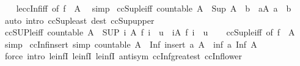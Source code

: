 \begin{isabellebody}
%
\isadelimproof
\ \ %
\endisadelimproof
%
\isatagproof
{}\isamarkupfalse%
\ le{\isacharunderscore}ccInf{\isacharunderscore}iff\ {\isacharbrackleft}of\ {\isachardoublequoteopen}f\ {\isacharbackquote}\ A{\isachardoublequoteclose}{\isacharbrackright}\ \isamarkupfalse%
\ simp%
\endisatagproof
{\isafoldproof}%
%
\isadelimproof
\isanewline
%
\endisadelimproof
\isanewline
{}\isamarkupfalse%
\ ccSup{\isacharunderscore}le{\isacharunderscore}iff{\isacharcolon}\ {\isachardoublequoteopen}countable\ A\ {\isasymLongrightarrow}\ Sup\ A\ {\isasymle}\ b\ {\isasymlongleftrightarrow}\ {\isacharparenleft}{\isasymforall}a{\isasymin}A{\isachardot}\ a\ {\isasymle}\ b{\isacharparenright}{\isachardoublequoteclose}\isanewline
%
\isadelimproof
\ \ %
\endisadelimproof
%
\isatagproof
{}\isamarkupfalse%
\ {\isacharparenleft}auto\ intro{\isacharcolon}\ ccSup{\isacharunderscore}least\ dest{\isacharcolon}\ ccSup{\isacharunderscore}upper{\isacharparenright}%
\endisatagproof
{\isafoldproof}%
%
\isadelimproof
\isanewline
%
\endisadelimproof
\isanewline
{}\isamarkupfalse%
\ ccSUP{\isacharunderscore}le{\isacharunderscore}iff{\isacharcolon}\ {\isachardoublequoteopen}countable\ A\ {\isasymLongrightarrow}\ {\isacharparenleft}SUP\ i\ {\isacharcolon}A{\isachardot}\ f\ i{\isacharparenright}\ {\isasymle}\ u\ {\isasymlongleftrightarrow}\ {\isacharparenleft}{\isasymforall}i{\isasymin}A{\isachardot}\ f\ i\ {\isasymle}\ u{\isacharparenright}{\isachardoublequoteclose}\isanewline
%
\isadelimproof
\ \ %
\endisadelimproof
%
\isatagproof
{}\isamarkupfalse%
\ ccSup{\isacharunderscore}le{\isacharunderscore}iff\ {\isacharbrackleft}of\ {\isachardoublequoteopen}f\ {\isacharbackquote}\ A{\isachardoublequoteclose}{\isacharbrackright}\ \isamarkupfalse%
\ simp%
\endisatagproof
{\isafoldproof}%
%
\isadelimproof
\isanewline
%
\endisadelimproof
\isanewline
{}\isamarkupfalse%
\ ccInf{\isacharunderscore}insert\ {\isacharbrackleft}simp{\isacharbrackright}{\isacharcolon}\ {\isachardoublequoteopen}countable\ A\ {\isasymLongrightarrow}\ Inf\ {\isacharparenleft}insert\ a\ A{\isacharparenright}\ {\isacharequal}\ inf\ a\ {\isacharparenleft}Inf\ A{\isacharparenright}{\isachardoublequoteclose}\isanewline
%
\isadelimproof
\ \ %
\endisadelimproof
%
\isatagproof
{}\isamarkupfalse%
\ {\isacharparenleft}force\ intro{\isacharcolon}\ le{\isacharunderscore}infI\ le{\isacharunderscore}infI{}\ le{\isacharunderscore}infI{}\ antisym\ ccInf{\isacharunderscore}greatest\ ccInf{\isacharunderscore}lower{\isacharparenright}%

\end{isabellebody}
